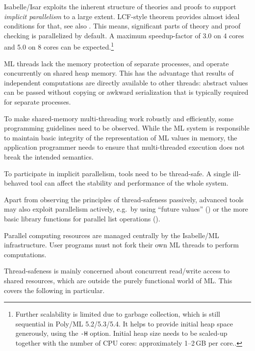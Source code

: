 \begin{isabellebody}
\begin{isamarkuptext}
  Isabelle/Isar exploits the inherent structure of theories and proofs
  to support \emph{implicit parallelism} to a large extent.  LCF-style
  theorem provides almost ideal conditions for that, see also
  \cite{Wenzel:2009}.  This means, significant parts of theory and
  proof checking is parallelized by default.  A maximum speedup-factor
  of 3.0 on 4 cores and 5.0 on 8 cores can be
  expected.\footnote{Further scalability is limited due to garbage
  collection, which is still sequential in Poly/ML 5.2/5.3/5.4.  It
  helps to provide initial heap space generously, using the
  \texttt{-H} option.  Initial heap size needs to be scaled-up
  together with the number of CPU cores: approximately 1--2\,GB per
  core..}

  \medskip ML threads lack the memory protection of separate
  processes, and operate concurrently on shared heap memory.  This has
  the advantage that results of independent computations are directly
  available to other threads: abstract values can be passed without
  copying or awkward serialization that is typically required for
  separate processes.

  To make shared-memory multi-threading work robustly and efficiently,
  some programming guidelines need to be observed.  While the ML
  system is responsible to maintain basic integrity of the
  representation of ML values in memory, the application programmer
  needs to ensure that multi-threaded execution does not break the
  intended semantics.

  \begin{warn}
  To participate in implicit parallelism, tools need to be
  thread-safe.  A single ill-behaved tool can affect the stability and
  performance of the whole system.
  \end{warn}

  Apart from observing the principles of thread-safeness passively,
  advanced tools may also exploit parallelism actively, e.g.\ by using
  ``future values'' () or the more basic library
  functions for parallel list operations ().

  \begin{warn}
  Parallel computing resources are managed centrally by the
  Isabelle/ML infrastructure.  User programs must not fork their own
  ML threads to perform computations.
  \end{warn}%
\end{isamarkuptext}%
\isamarkuptrue%
%
\isamarkuptrue%
%
\begin{isamarkuptext}%
Thread-safeness is mainly concerned about concurrent
  read/write access to shared resources, which are outside the purely
  functional world of ML.  This covers the following in particular.


\end{isamarkuptext}
\end{isabellebody}

